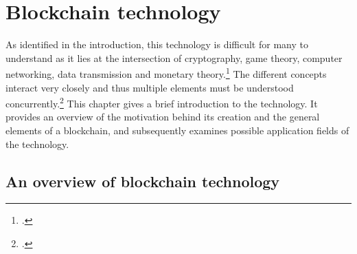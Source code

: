 \chapter{Blockchain technology} \label{chap:Blockchain}

As identified in the introduction, this technology is difficult for many to understand as it lies at the intersection of cryptography, game theory, computer networking, data transmission and monetary theory.\footcite[Cf.][]{LoppNobodyUnderstandsBitcoin2017} The different concepts interact very closely and thus multiple elements must be understood concurrently.\footcite[Cf.][p.2]{SwellerVisualisationInstructionalDesign2002} This chapter gives a  brief introduction to the technology. It provides an overview of the motivation behind its creation and the general elements of a blockchain, and subsequently examines possible application fields of the technology. 

\section{An overview of blockchain technology} \label{sec:Blockchain}

